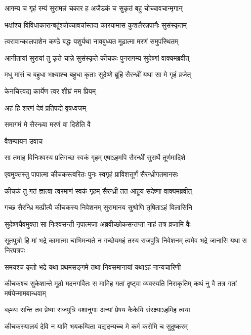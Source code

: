 \twolineshloka
{आगम्य च गृहं रम्यं सुरामन्नं चकार ह}
{अजैडकं च सुकृतं बहु चोच्चावचान्मृगान्}


\twolineshloka
{भक्षांश्च विविधाकारान्बहूंश्चोच्चावचांस्तदा}
{कारयामास कुशलैरन्नपानैः सुसंस्कृतम्}


\twolineshloka
{त्वरावान्कालपाशेन कण्ठे बद्धः पशुर्यथा}
{नावबुध्यत मूढात्मा मरणं समुपस्थितम्}


\twolineshloka
{आनीतायां सुरायां तु कृते चान्ने सुसंस्कृते}
{कीचकः पुनरागम्य सुदेष्णां वाक्यमब्रवीत्}


\twolineshloka
{मधु मांसं च बहुधा भक्ष्याश्च बहुधा कृताः}
{सुदेष्णे ब्रूहि सैरन्ध्रीं यथा सा मे गृहं व्रजेत्}


\onelineshloka
{केनचित्त्वद्य कार्येण त्वर शीघ्रं मम प्रियम्}

अहं हि शरणं देवं प्रतिपद्ये वृषध्वजम्

समागमं मे सैरन्ध्र्या मरणं वा दिशेति वै

वैशम्पायन उवाच


\twolineshloka
{सा तमाह विनिःश्वस्य प्रतिगच्छ स्वकं गृहम्}
{एषाऽहमपि सैरन्ध्रीं सुरार्थे तूर्णमादिशे}


\twolineshloka
{एवमुक्तस्तु पापात्मा कीचकस्त्वरितः पुनः}
{स्वगृहं प्राविशत्तूर्णं सैरन्ध्रीगतमानसः}


\twolineshloka
{कीचकं तु गतं ज्ञात्वा त्वरमाणं स्वकं गृहम्}
{सैरन्ध्रीं तत आहूय सदेष्णा वाक्यमब्रवीत्}


\twolineshloka
{गच्छ सैरन्ध्रि मत्प्रीत्यै कीचकस्य निवेशनम्}
{सुरामानय सुश्रोणि तृषिताऽहं विलासिनि}



\twolineshloka
{सुदेष्णयैवमुक्ता सा निःश्वसन्ती नृपात्मजा}
{अब्रवीच्छोकसन्तप्ता नाहं तत्र व्रजामि वैः}


\threelineshloka
{सूतपुत्रो हि मां भद्रे कामात्मा चाभिमन्यते}
{न गच्छेयमहं तस्य राजपुत्रि निवेशनम्}
{त्वमेव भद्रे जानासि यथा स निरपत्रपः}


\twolineshloka
{समयश्च कृतो भद्रे यथा प्रथमसङ्गमे}
{तथा निवसमानायां यथाऽहं नान्यचारिणी}


\threelineshloka
{कीचकश्च सुकेशान्ते मूढो मदनगर्वितः}
{स मामिह गतां दृष्ट्वा व्यवस्यति निराकृतिम्}
{कथं नु वै तत्र गतां मर्षयेन्मामबान्धवाम्}


\twolineshloka
{बह्व्यः सन्ति तव प्रेष्या राजपुत्रि वशानुगाः}
{अन्यां प्रेषय कैकेयि संरक्ष्याऽहमिह त्वया}


\twolineshloka
{कीचकस्यालयं देवि न यामि भयकम्पिता}
{यद्यदन्यच्च मे कर्म करोमि च सुदुष्करम्}


